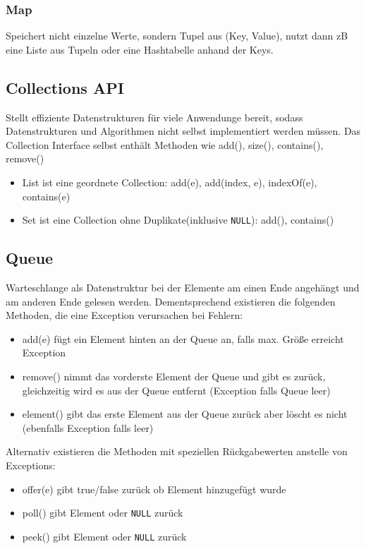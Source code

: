 \documentclass[12pt,a4]{article}
\begin{document}
	\subsubsection{Map}
	Speichert nicht einzelne Werte, sondern Tupel aus (Key, Value), nutzt dann zB eine Liste aus Tupeln oder eine Hashtabelle anhand der Keys.
	
	\subsection{Collections API}
	Stellt effiziente Datenstrukturen für viele Anwendunge bereit, sodass Datenstrukturen und Algorithmen nicht selbst implementiert werden müssen.
	Das Collection Interface selbst enthält Methoden wie add(), size(), contains(), remove()
	\begin{itemize}
	
	\item List ist eine geordnete Collection: add(e), add(index, e), indexOf(e), contains(e) 
	\item Set ist eine Collection ohne Duplikate(inklusive \texttt{NULL}): add(), contains()
	\end{itemize}
	\subsection{Queue}
	Warteschlange als Datenstruktur bei der Elemente am einen Ende angehängt und am anderen Ende gelesen werden. Dementsprechend existieren die folgenden Methoden, die eine Exception verursachen bei Fehlern:
	
	\begin{itemize}
		\item add(e) fügt ein Element hinten an der Queue an, falls max. Größe erreicht Exception
		\item remove() nimmt das vorderste Element der Queue und gibt es zurück, gleichzeitig wird es aus der Queue entfernt (Exception falls Queue leer)
		\item element() gibt das erste Element aus der Queue zurück aber löscht es nicht (ebenfalls Exception falls leer)
	\end{itemize}

	Alternativ existieren die Methoden mit speziellen Rückgabewerten anstelle von Exceptions:
	\begin{itemize}
		\item offer(e) gibt true/false zurück ob Element hinzugefügt wurde
		\item poll() gibt Element oder \texttt{NULL} zurück
		\item peek() gibt Element oder \texttt{NULL} zurück
	\end{itemize}
\end{document}
